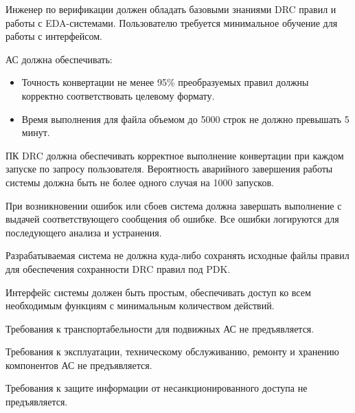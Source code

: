 Инженер по верификации должен обладать базовыми знаниями DRC правил
и работы с EDA-системами.
Пользователю требуется минимальное обучение для работы с интерфейсом.


АС должна обеспечивать:

\begin{itemize}
	\item Точность конвертации не менее 95\%
		преобразуемых правил должны корректно
		соответствовать целевому формату.
	\item Время выполнения для файла объемом
		до 5000 строк не должно превышать 5 минут.
\end{itemize}


ПК DRC должна обеспечивать корректное выполнение конвертации
при каждом запуске по запросу пользователя.
Вероятность аварийного завершения работы системы должна быть
не более одного случая на 1000 запусков.

При возникновении ошибок или сбоев система должна завершать выполнение
с выдачей соответствующего сообщения об ошибке.
Все ошибки логируются для последующего анализа и устранения.


Разрабатываемая система не должна куда-либо сохранять исходные файлы правил
для обеспечения сохранности DRC правил под PDK.


Интерфейс системы должен быть простым,
обеспечивать доступ ко всем необходимым функциям
с минимальным количеством действий.


Требования к транспортабельности для подвижных АС
не предъявляется.


Требования к эксплуатации, техническому обслуживанию,
ремонту и хранению компонентов АС не предъявляется.


Требования к защите информации от несанкционированного доступа
не предъявляется.

